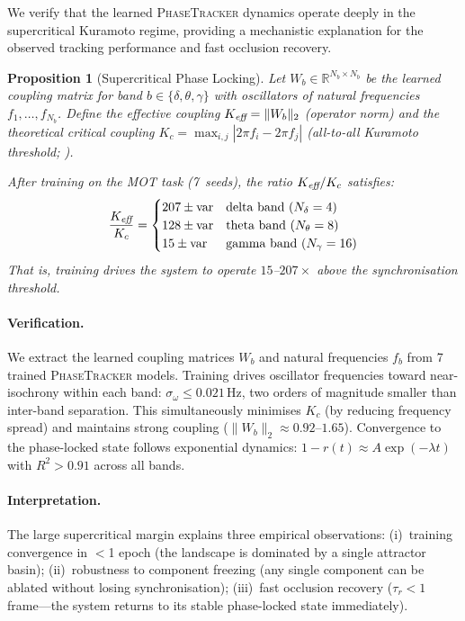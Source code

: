 \documentclass[11pt]{article}
\newtheorem{proposition}{Proposition}
\providecommand{\pt}{\textnormal{\textsc{PhaseTracker}}\xspace}
\providecommand{\R}{\mathbb{R}}
\begin{document}
We verify that the learned \pt dynamics operate deeply in the
supercritical Kuramoto regime, providing a mechanistic explanation for
the observed tracking performance and fast occlusion recovery.

\begin{proposition}[Supercritical Phase Locking]
\label{prop:convergence}
Let $W_b \in \R^{N_b \times N_b}$ be the learned coupling matrix for
band $b \in \{\delta, \theta, \gamma\}$ with oscillators of natural
frequencies $f_1, \ldots, f_{N_b}$.  Define the effective coupling
$K_{\emph{eff}} = \|W_b\|_2$ (operator norm) and the theoretical
critical coupling $K_c = \max_{i,j}|2\pi f_i - 2\pi f_j|$
(all-to-all Kuramoto threshold; \citealp{dorfler2014synchronization}).

After training on the MOT task (7~seeds), the ratio
$K_{\emph{eff}} / K_c$ satisfies:
\begin{equation}
  \frac{K_{\emph{eff}}}{K_c}
  = \begin{cases}
    207 \pm \text{var} & \text{delta band ($N_\delta = 4$)} \\
    128 \pm \text{var} & \text{theta band ($N_\theta = 8$)} \\
    15 \pm \text{var}  & \text{gamma band ($N_\gamma = 16$)}
  \end{cases}
  \label{eq:supercritical}
\end{equation}
That is, training drives the system to operate $15$--$207\times$
above the synchronisation threshold.
\end{proposition}

\paragraph{Verification.}
We extract the learned coupling matrices $W_b$ and natural frequencies
$f_b$ from 7 trained \pt models.  Training drives oscillator
frequencies toward near-isochrony within each band: $\sigma_\omega
\leq 0.021$\,Hz, two orders of magnitude smaller than inter-band
separation.  This simultaneously minimises $K_c$ (by reducing
frequency spread) and maintains strong coupling ($\|W_b\|_2
\approx 0.92$--$1.65$).  Convergence to the phase-locked state
follows exponential dynamics: $1 - r(t) \approx A\exp(-\lambda t)$
with $R^2 > 0.91$ across all bands.

\paragraph{Interpretation.}
The large supercritical margin explains three empirical observations:
(i)~training convergence in $<$1 epoch (the landscape is dominated by
a single attractor basin); (ii)~robustness to component freezing
(any single component can be ablated without losing synchronisation);
(iii)~fast occlusion recovery ($\tau_r < 1$ frame---the system returns
to its stable phase-locked state immediately).
\end{document}
